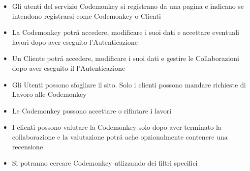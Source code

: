 \begin{itemize}
\large
\item Gli utenti del servizio Codemonkey si registrano da una pagina e indicano se intendono registrarsi come Codemonkey o Clienti
\item La Codemonkey potrá accedere, modificare i suoi dati e accettare eventuali lavori dopo aver eseguito l'Autenticazione
\item Un Cliente potrá accedere, modificare i suoi dati e gestire le Collaborazioni dopo aver eseguito il l'Autenticazione
\item Gli Utenti possono sfogliare il sito. Solo i clienti possono mandare richieste di Lavoro alle Codemonkey
\item Le Codemonkey possono accettare o rifiutare i lavori
\item I clienti possono valutare la Codemonkey solo dopo aver terminato la collaborazione e la valutazione potrá ache opzionalmente contenere una recensione
\item Si potranno cercare Codemonkey utlizzando dei filtri specifici
\end{itemize}
